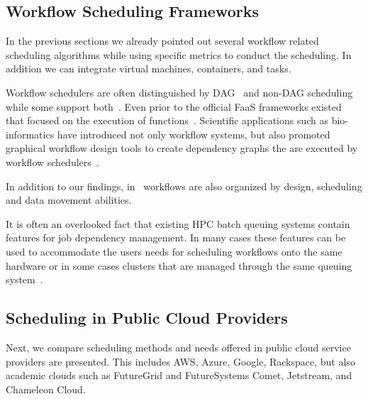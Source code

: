 \documentclass[final,5p,times,twocolumn]{elsarticle}
\begin{document}





\subsection{Workflow Scheduling Frameworks} 
\label{sec:workflow}



In the previous sections we already pointed out several workflow
related scheduling algorithms while using specific metrics to conduct
the scheduling. In addition we can integrate virtual machines,
containers, and tasks.

Workflow schedulers are often distinguished by
DAG~\cite{deelman2005pegasus,deelman2004pegasus,thain2005distributed}
and non-DAG scheduling while some support
both~\cite{las-karajan,las-cogkit-1,las06-workflow-book}. Even prior
to the official FaaS frameworks existed that focused on the execution
of functions~\cite{las-infogram}.  Scientific applications such as
bio-informatics have introduced not only workflow systems, but also
promoted graphical workflow design tools to create dependency graphs
the are executed by workflow
schedulers~\cite{oinn2004taverna,tan2010comparison}.
  
In addition to our findings, in~\cite{yu2005taxonomy} workflows are
also organized by design, scheduling and data movement abilities.

It is often an overlooked fact that existing HPC batch queuing systems
contain features for job dependency management. In many cases these
features can be used to accommodate the users needs for scheduling
workflows onto the same hardware or in some cases clusters that are
managed through the same queuing
system~\cite{www-lsf-job-dep,www-moab-job-dep,www-univa-GE-manual,www-pbs-manual}.



\subsection{Scheduling in Public Cloud Providers}
\label{sec:public}



Next, we compare scheduling methods and needs offered in public cloud
service providers are presented. This includes AWS, Azure, Google,
Rackspace, but also academic clouds such as FutureGrid and
FutureSystems Comet, Jetstream, and Chameleon Cloud.
\end{document}
